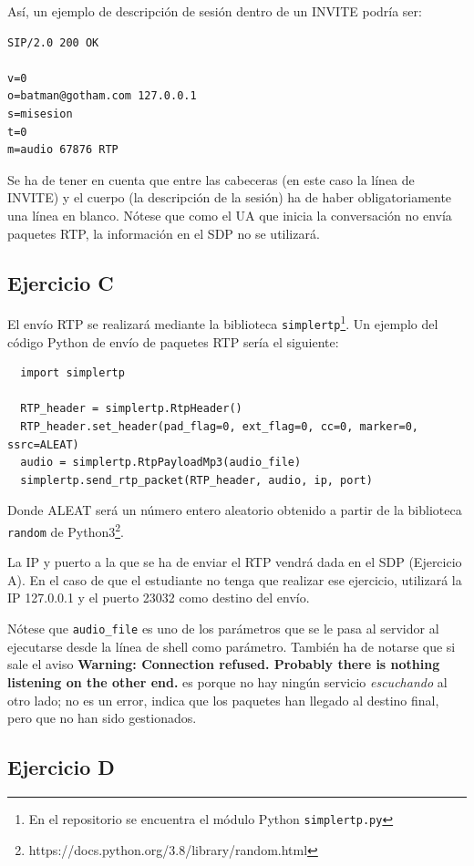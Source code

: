 \documentclass[a4paper,11pt]{article}
\begin{document}
Así, un ejemplo de descripción de sesión dentro de un INVITE podría ser:

\begin{verbatim}
SIP/2.0 200 OK

v=0
o=batman@gotham.com 127.0.0.1
s=misesion
t=0
m=audio 67876 RTP
\end{verbatim}

Se ha de tener en cuenta que entre las cabeceras (en este caso la línea de INVITE) y el cuerpo (la descripción de la sesión) ha de haber obligatoriamente una línea en blanco. Nótese que como el UA que inicia la conversación no envía paquetes RTP, la información en el SDP no se utilizará.


\subsection*{Ejercicio C}

El envío RTP se realizará mediante la biblioteca \texttt{simplertp}\footnote{En el repositorio se encuentra el módulo Python \texttt{simplertp.py}}. Un ejemplo del código Python de envío de paquetes RTP sería el siguiente:

\begin{verbatim}
  import simplertp

  RTP_header = simplertp.RtpHeader()
  RTP_header.set_header(pad_flag=0, ext_flag=0, cc=0, marker=0, ssrc=ALEAT)
  audio = simplertp.RtpPayloadMp3(audio_file)
  simplertp.send_rtp_packet(RTP_header, audio, ip, port)
\end{verbatim}

Donde ALEAT será un número entero aleatorio obtenido a partir de la biblioteca \texttt{random} de Python3\footnote{https://docs.python.org/3.8/library/random.html}.

La IP y puerto a la que se ha de enviar el RTP vendrá dada en el SDP (Ejercicio A). En el caso de que el estudiante no tenga que realizar ese ejercicio, utilizará la IP 127.0.0.1 y el puerto 23032 como destino del envío.

Nótese que \texttt{audio\_file} es uno de los parámetros que se le pasa al servidor al ejecutarse desde la línea de shell como parámetro. También ha de notarse que si sale el aviso {\bf Warning: Connection refused. Probably there is nothing listening on the other end.} es porque no hay ningún servicio \emph{escuchando} al otro lado; no es un error, indica que los paquetes han llegado al destino final, pero que no han sido gestionados.

\subsection*{Ejercicio D}
\end{document}
